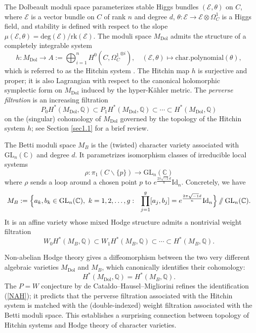 \documentclass[11pt]{amsart}
\theoremstyle{plain}
\theoremstyle{definition}
\theoremstyle{remark}
\newcommand{\BC}{{\mathbb{C}}}
\newcommand{\BQ}{{\mathbb{Q}}}
\newcommand{\CE}{{\mathcal E}}
\newcommand{\git}{\mathbin{
  \mathchoice{/\mkern-6mu/}%
    {/\mkern-6mu/}%
    {/\mkern-5mu/}%
    {/\mkern-5mu/}}}%
\begin{document}
The Dolbeault moduli space parameterizes stable Higgs bundles $(\CE, \theta)$ on $C$, where $\CE$ is a vector bundle on $C$ of rank $n$ and degree $d$, $\theta: \CE \to \CE \otimes \Omega_C^1$ is a Higgs field, and stability is defined with respect to the slope $\mu(\CE,\theta) ={\mathrm{deg}(\CE)}/{\mathrm{rk(\CE)}}$. The moduli space $M_{\mathrm{Dol}}$ admits the structure of a completely integrable system
\[
h: M_{\mathrm{Dol}} \to A := \bigoplus_{i=1}^n H^0(C, {\Omega_C^{1}}^{\otimes i}), \quad (\CE, \theta) \mapsto \mathrm{char.polynomial}(\theta),
\]
which is referred to as the Hitchin system \cite{Hit, Hit1}. The Hitchin map $h$ is surjective and proper; it is also Lagrangian with respect to the canonical holomorphic symplectic form on $M_{\mathrm{Dol}}$ induced by the hyper-K\"ahler metric. The \emph{perverse filtration} is an increasing filtration 
\[
P_0H^*(M_{\mathrm{Dol}}, \BQ)\subset P_1H^*(M_{\mathrm{Dol}}, \BQ) \subset \cdots \subset H^*(M_{\mathrm{Dol}}, \BQ)
 \]
on the (singular) cohomology of $M_{\mathrm{Dol}}$ governed by the topology of the Hitchin system $h$; see Section \ref{sec1.1} for a brief review.

The Betti moduli space $M_B$ is the (twisted) character variety associated with $\mathrm{GL}_n(\BC)$ and degree $d$.  It parametrizes isomorphism classes of irreducible local systems
\[
\rho: \pi_1(C\backslash \{p\}) \rightarrow \mathrm{GL}_n(\BC)
\]
where $\rho$ sends a loop around a chosen point $p$ to 
$e^{\frac{2\pi \sqrt{-1} d}{n}}\mathrm{Id}_n$.  Concretely, we have
\begin{equation*}
M_B := \Big{\{}a_k, b_k \in \mathrm{GL}_n(\BC),~k=1,2,\dots,g: ~~\prod_{j=1}^g [a_j, b_j] = e^{\frac{2\pi \sqrt{-1} d}{n}}\mathrm{Id}_n \Big{\}}\git\mathrm{GL}_n(\BC).
\end{equation*}
It is an affine variety whose mixed Hodge structure admits a nontrivial weight filtration 
\[
W_0 H^*(M_B, \BQ) \subset W_1H^*(M_B, \BQ) \subset \cdots \subset H^*(M_B, \BQ).
\]

Non-abelian Hodge theory \cite{Simp, Si1994II} gives a diffeomorphism between the two very different algebraic varieties $M_{\mathrm{Dol}}$ and $M_B$, which canonically identifies their cohomology:
\begin{equation}\label{NAH}
 H^*(M_{\mathrm{Dol}}, \BQ)  = H^*(M_{B}, \BQ).
\end{equation}
The $P=W$ conjecture by de Cataldo--Hausel--Migliorini \cite{dCHM1} 
refines the identification (\ref{NAH}); it predicts that the perverse filtration associated with the Hitchin system is matched with the (double-indexed) weight filtration associated with the Betti moduli space. This establishes a surprising connection between topology of Hitchin systems and Hodge theory of character varieties.
\end{document}
